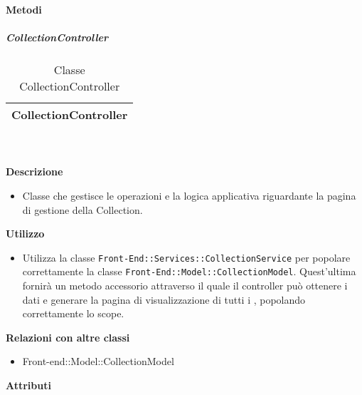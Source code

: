 		\textbf{Metodi} 
	\begin{itemize}
		\end{itemize}
			\subparagraph{CollectionController} 
\begin{table}[ht]
\begin{center}
\bgroup
	\setlength{\arrayrulewidth}{0.6mm}
	\def\arraystretch{1}
		\begin{tabular}{ | p{12cm} | }
				\hline  
					\centerline{\textbf{CollectionController}}
		\\ \hline 
				\hline
				\hline
		
		\end{tabular}
\egroup
\caption{Classe CollectionController}
\end{center}
\end{table}  \textbf{\\ \\ Descrizione} 
					\begin{itemize}
						\item[] Classe che gestisce le operazioni e la logica applicativa riguardante la pagina di gestione della Collection.
					\end{itemize}      
				\textbf{Utilizzo}  
					\begin{itemize}
						\item[] Utilizza la classe \texttt{Front-End::Services::CollectionService} per popolare correttamente la classe \texttt{Front-End::Model::CollectionModel}. Quest'ultima fornirà un metodo accessorio attraverso il quale il controller può ottenere i dati e generare la pagina di visualizzazione di tutti i , popolando correttamente lo scope.
					\end{itemize}
					\textbf{Relazioni con altre classi}
					\begin{itemize}
							\item{Front-end::Model::CollectionModel}
					\end{itemize}
			 \textbf{Attributi} 
	\begin{itemize}
		\end{itemize}
		
